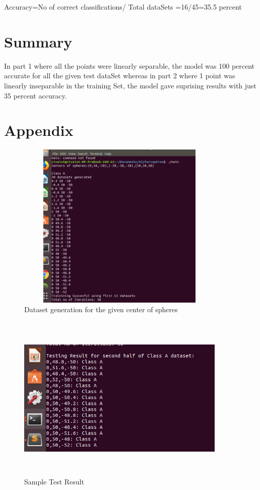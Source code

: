 \documentclass[letterpaper]{article}
\begin{document}
Accuracy=No of correct classifications/ Total dataSets =16/45=35.5 percent 

  \section {Summary}
  In part 1 where all the points were linearly separable, the model was 100 percent accurate for all the given test dataSet whereas in part 2 where 1 point was linearly inseparable in the training Set, the model gave suprising results with just 35 percent accuracy. 

  \section {Appendix}

\begin{figure}[h]
\caption{Dataset generation for the given center of spheres}
\centering
\includegraphics[width=10cm,height=8cm]{Dataset_generation}
\end{figure}

\begin{figure}[h]
\caption{Sample Test Result}
\centering
\includegraphics[width=10cm,height=8cm]{test_result}
\end{figure}
 
\end{document}
